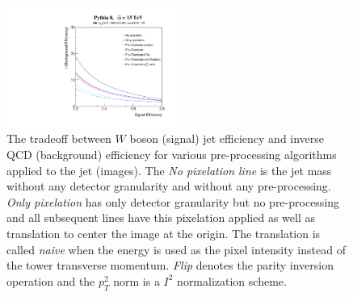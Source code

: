 \begin{figure}[htbp!]
  \begin{center}
        \includegraphics[width=0.5\textwidth]{figures/ROCs_compare.pdf}
      \caption{ The tradeoff between $W$ boson (signal) jet efficiency and inverse QCD (background) efficiency for various pre-processing algorithms applied to the jet (images).  The {\it No pixelation line} is the jet mass without any detector granularity and without any pre-processing.  {\it Only pixelation} has only detector granularity but no pre-processing and all subsequent lines have this pixelation applied as well as translation to center the image at the origin.  The translation is called {\it naive} when the energy is used as the pixel intensity instead of the tower transverse momentum.  {\it Flip} denotes the parity inversion operation and the $p_T^2$ norm is a $I^2$ normalization scheme.  
      \label{fig:preprocess3} }
    \end{center}
\end{figure}


